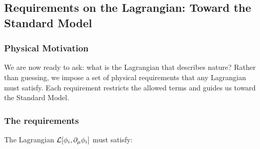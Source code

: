 \documentclass[../main.tex]{subfiles}
\begin{document}
\subsection*{Requirements on the Lagrangian: Toward the Standard Model}

\subsubsection*{Physical Motivation}

We are now ready to ask: what is the Lagrangian that describes nature?  Rather than guessing, we impose a set of physical requirements that any Lagrangian must satisfy.  Each requirement restricts the allowed terms and guides us toward the Standard Model.

\subsubsection*{The requirements}

The Lagrangian $\mathcal{L}[\phi_i, \partial_\mu\phi_i]$ must satisfy:
\end{document}
